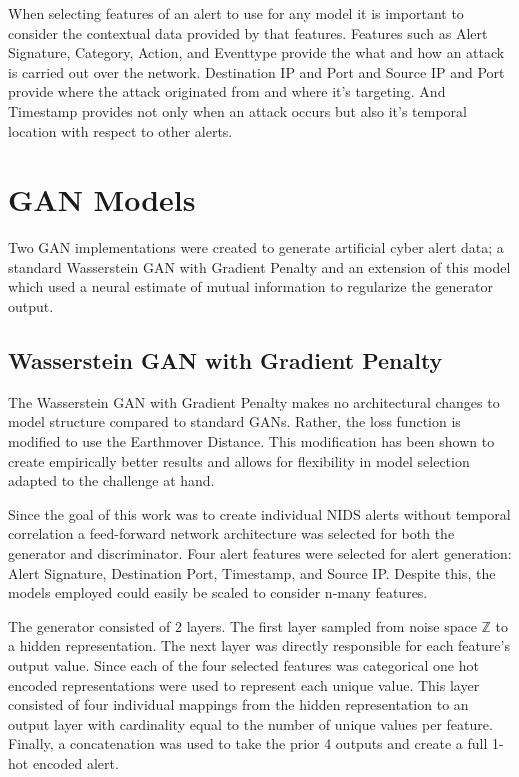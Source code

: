 When selecting features of an alert to use for any model it is important to consider the contextual data provided by that features. Features such as Alert Signature, Category, Action, and Eventtype provide the what and how an attack is carried out over the network. Destination IP and Port and Source IP and Port provide where the attack originated from and where it's targeting.  And Timestamp provides not only when an attack occurs but also it's temporal location with respect to other alerts.


\section{GAN Models}
\label{sec:model_arch}
Two GAN implementations were created to generate artificial cyber alert data; a standard Wasserstein GAN with Gradient Penalty and an extension of this model which used a neural estimate of mutual information to regularize the generator output.  

\subsection{Wasserstein GAN with Gradient Penalty}
\label{sec:gan}
The Wasserstein GAN with Gradient Penalty makes no architectural changes to model structure compared to standard GANs. Rather, the loss function is modified to use the Earthmover Distance. This modification has been shown to create empirically better results and allows for flexibility in model selection adapted to the challenge at hand.

Since the goal of this work was to create individual NIDS alerts without temporal correlation a feed-forward network architecture was selected for both the generator and discriminator. Four alert features were selected for alert generation: Alert Signature, Destination Port, Timestamp, and Source IP. Despite this, the models employed could easily be scaled to consider n-many features. 

The generator consisted of 2 layers. The first layer sampled from noise space $\mathbb{Z}$ to a hidden representation. The next layer was directly responsible for each feature's output value. Since each of the four selected features was categorical one hot encoded representations were used to represent each unique value. This layer consisted of four individual mappings from the hidden representation to an output layer with cardinality equal to the number of unique values per feature. Finally, a concatenation was used to take the prior 4 outputs and create a full 1-hot encoded alert. 

